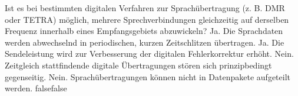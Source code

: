     {Ist es bei bestimmten digitalen Verfahren zur Sprachübertragung (z. B. DMR oder TETRA) möglich, mehrere Sprechverbindungen gleichzeitig auf derselben Frequenz innerhalb eines Empfangsgebiets abzuwickeln?}
    {Ja. Die Sprachdaten werden abwechselnd in periodischen, kurzen Zeitschlitzen übertragen.}
    {Ja. Die Sendeleistung wird zur Verbesserung der digitalen Fehlerkorrektur erhöht.}
    {Nein. Zeitgleich stattfindende digitale Übertragungen stören sich prinzipbedingt gegenseitig.}
    {Nein. Sprachübertragungen können nicht in Datenpakete aufgeteilt werden.}
    {false}{false}